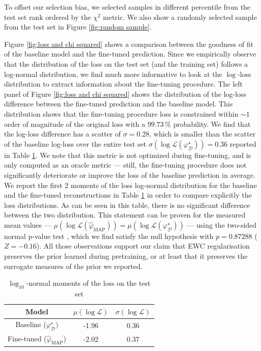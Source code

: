 To offset our selection bias, we selected samples in different percentile from the
test set rank ordered by the $\chi^2$ metric. 
We also show a randomly selected sample from the test set in Figure \ref{fig:random sample}.

Figure \ref{fig:loss and chi squared} shows a comparison between 
the goodness of fit of the baseline model and the fine-tuned prediction. 
Since we empirically observe that the distribution of the loss on the test set (and the training set) follows a log-normal distribution, we find much more informative to look at the $\log$-loss 
distribution to extract information about the fine-tuning procedure. 
The left panel of Figure \ref{fig:loss and chi squared} 
shows the distribution of the log-loss difference between the fine-tuned prediction and the baseline model. This distribution shows that the fine-tuning procedure loss is constrained within $\sim 1$ order of magnitude of the original loss with a $99.73\,\%$ probability. We find that the log-loss difference has a scatter of $\sigma = 0.28$, which is smaller than the scatter of the baseline log-loss over the entire test set $\sigma(\log \mathcal{L}(\varphi^\star_{\mathcal{D}})) = 0.36$ reported in Table \ref{tab:loss}.
We note that this metric is not optimized during fine-tuning, 
and is only computed as an oracle metric --- still, the fine-tuning procedure does not significantly deteriorate or improve the loss of the baseline prediction in average. We report the first 2 moments of the loss log-normal distribution for the baseline and the fine-tuned reconstructions in Table \ref{tab:loss} in order to compare explicitly the loss distributions. As can be seen in this table, there is no significant difference between the two distribution. This statement can be proven for the measured mean values --- $\mu(\log \mathcal{L}(\hat{\varphi}_{\mathrm{MAP}})) = \mu(\log \mathcal{L}(\varphi^{\star}_{\mathcal{D}})) $ --- using the two-sided normal p-value test \citep{Casella2001}, which we find satisfy the null hypothesis with $p=0.87288$ ($Z = -0.16$). All those observations support our claim that EWC regularisation preserves the prior learned during pretraining, or at least that it preserves the surrogate measures of the prior we reported. 
\begin{table}[]
    \centering
    \caption{$\log_{10}$-normal moments of the loss on the test set}
    \label{tab:loss}
    \begin{tabular}{ccc}
        \hline
          Model  & $\mu(\log \mathcal{L})$ & $\sigma(\log \mathcal{L})$ \\
        \hline \hline
        Baseline ($\varphi_{\mathcal{D}}^\star)$ &  -1.96 & 0.36 \\
        Fine-tuned ($\hat{\varphi}_{\mathrm{MAP}}$) & -2.02 & 0.37 \\\hline
    \end{tabular}

\end{table}

